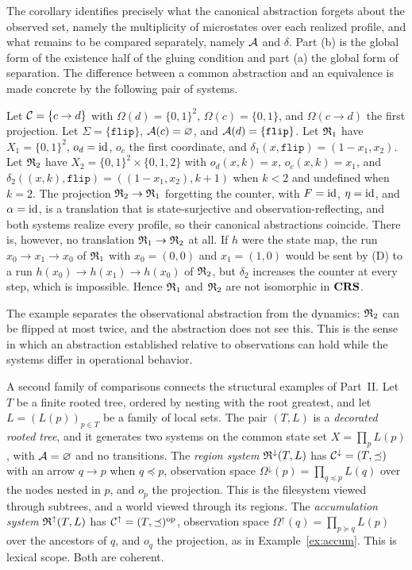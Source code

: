 The corollary identifies precisely what the canonical abstraction forgets about the observed set, namely the multiplicity of microstates over each realized profile, and what remains to be compared separately, namely $\mathcal A$ and $\delta$. Part (b) is the global form of the existence half of the gluing condition and part (a) the global form of separation. The difference between a common abstraction and an equivalence is made concrete by the following pair of systems.

\begin{example}\label{ex:flip}
Let $\mathcal C=\{c\to d\}$ with $\Omega(d)=\{0,1\}^2$, $\Omega(c)=\{0,1\}$, and $\Omega(c\to d)$ the first projection. Let $\Sigma=\{\texttt{flip}\}$, $\mathcal A(c)=\varnothing$, and $\mathcal A(d)=\{\texttt{flip}\}$. Let $\mathfrak R_1$ have $X_1=\{0,1\}^2$, $o_d=\mathrm{id}$, $o_c$ the first coordinate, and $\delta_1(x,\texttt{flip})=(1-x_1,x_2)$. Let $\mathfrak R_2$ have $X_2=\{0,1\}^2\times\{0,1,2\}$ with $o_d(x,k)=x$, $o_c(x,k)=x_1$, and $\delta_2((x,k),\texttt{flip})=((1-x_1,x_2),k+1)$ when $k<2$ and undefined when $k=2$. The projection $\mathfrak R_2\to\mathfrak R_1$ forgetting the counter, with $F=\mathrm{id}$, $\eta=\mathrm{id}$, and $\alpha=\mathrm{id}$, is a translation that is state-surjective and observation-reflecting, and both systems realize every profile, so their canonical abstractions coincide. There is, however, no translation $\mathfrak R_1\to\mathfrak R_2$ at all. If $h$ were the state map, the run $x_0\to x_1\to x_0$ of $\mathfrak R_1$ with $x_0=(0,0)$ and $x_1=(1,0)$ would be sent by (D) to a run $h(x_0)\to h(x_1)\to h(x_0)$ of $\mathfrak R_2$, but $\delta_2$ increases the counter at every step, which is impossible. Hence $\mathfrak R_1$ and $\mathfrak R_2$ are not isomorphic in $\mathbf{CRS}$.
\end{example}

The example separates the observational abstraction from the dynamics: $\mathfrak R_2$ can be flipped at most twice, and the abstraction does not see this. This is the sense in which an abstraction established relative to observations can hold while the systems differ in operational behavior.

A second family of comparisons connects the structural examples of Part~II. Let $T$ be a finite rooted tree, ordered by nesting with the root greatest, and let $L=(L(p))_{p\in T}$ be a family of local sets. The pair $(T,L)$ is a \emph{decorated rooted tree}, and it generates two systems on the common state set $X=\prod_pL(p)$, with $\mathcal A=\varnothing$ and no transitions. The \emph{region system} $\mathfrak R^{\downarrow}(T,L)$ has $\mathcal C^{\downarrow}=(T,\preceq)$ with an arrow $q\to p$ when $q\preceq p$, observation space $\Omega^{\downarrow}(p)=\prod_{q\preceq p}L(q)$ over the nodes nested in $p$, and $o_p$ the projection. This is the filesystem viewed through subtrees, and a world viewed through its regions. The \emph{accumulation system} $\mathfrak R^{\uparrow}(T,L)$ has $\mathcal C^{\uparrow}=(T,\preceq)^{\mathrm{op}}$, observation space $\Omega^{\uparrow}(q)=\prod_{p\succeq q}L(p)$ over the ancestors of $q$, and $o_q$ the projection, as in Example~\ref{ex:accum}. This is lexical scope. Both are coherent.

